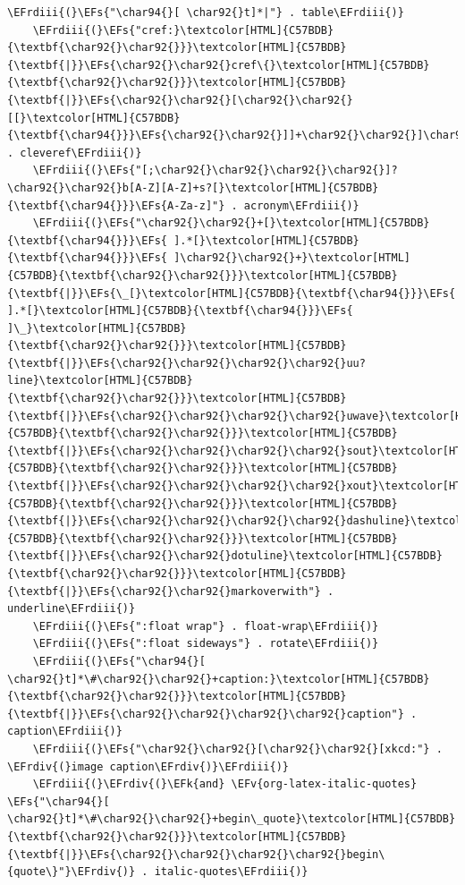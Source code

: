 \documentclass{scrartcl}
\newcommand{\EFk}[1]{\textcolor{EFk}{#1}} %
\newcommand{\EFs}[1]{\textcolor{EFs}{#1}} %
\newcommand{\EFv}[1]{\textcolor{EFv}{#1}} %
\newcommand{\EFrdiii}[1]{#1} %
\newcommand{\EFrdiv}[1]{#1} %
\begin{document}
\begin{Code}
\begin{Verbatim}[]
    \EFrdiii{(}\EFs{"\char94{}[ \char92{}t]*|"} . table\EFrdiii{)}
    \EFrdiii{(}\EFs{"cref:}\textcolor[HTML]{C57BDB}{\textbf{\char92{}\char92{}}}\textcolor[HTML]{C57BDB}{\textbf{|}}\EFs{\char92{}\char92{}cref\{}\textcolor[HTML]{C57BDB}{\textbf{\char92{}\char92{}}}\textcolor[HTML]{C57BDB}{\textbf{|}}\EFs{\char92{}\char92{}[\char92{}\char92{}[[}\textcolor[HTML]{C57BDB}{\textbf{\char94{}}}\EFs{\char92{}\char92{}]]+\char92{}\char92{}]\char92{}\char92{}]"} . cleveref\EFrdiii{)}
    \EFrdiii{(}\EFs{"[;\char92{}\char92{}\char92{}\char92{}]?\char92{}\char92{}b[A-Z][A-Z]+s?[}\textcolor[HTML]{C57BDB}{\textbf{\char94{}}}\EFs{A-Za-z]"} . acronym\EFrdiii{)}
    \EFrdiii{(}\EFs{"\char92{}\char92{}+[}\textcolor[HTML]{C57BDB}{\textbf{\char94{}}}\EFs{ ].*[}\textcolor[HTML]{C57BDB}{\textbf{\char94{}}}\EFs{ ]\char92{}\char92{}+}\textcolor[HTML]{C57BDB}{\textbf{\char92{}\char92{}}}\textcolor[HTML]{C57BDB}{\textbf{|}}\EFs{\_[}\textcolor[HTML]{C57BDB}{\textbf{\char94{}}}\EFs{ ].*[}\textcolor[HTML]{C57BDB}{\textbf{\char94{}}}\EFs{ ]\_}\textcolor[HTML]{C57BDB}{\textbf{\char92{}\char92{}}}\textcolor[HTML]{C57BDB}{\textbf{|}}\EFs{\char92{}\char92{}\char92{}\char92{}uu?line}\textcolor[HTML]{C57BDB}{\textbf{\char92{}\char92{}}}\textcolor[HTML]{C57BDB}{\textbf{|}}\EFs{\char92{}\char92{}\char92{}\char92{}uwave}\textcolor[HTML]{C57BDB}{\textbf{\char92{}\char92{}}}\textcolor[HTML]{C57BDB}{\textbf{|}}\EFs{\char92{}\char92{}\char92{}\char92{}sout}\textcolor[HTML]{C57BDB}{\textbf{\char92{}\char92{}}}\textcolor[HTML]{C57BDB}{\textbf{|}}\EFs{\char92{}\char92{}\char92{}\char92{}xout}\textcolor[HTML]{C57BDB}{\textbf{\char92{}\char92{}}}\textcolor[HTML]{C57BDB}{\textbf{|}}\EFs{\char92{}\char92{}\char92{}\char92{}dashuline}\textcolor[HTML]{C57BDB}{\textbf{\char92{}\char92{}}}\textcolor[HTML]{C57BDB}{\textbf{|}}\EFs{\char92{}\char92{}dotuline}\textcolor[HTML]{C57BDB}{\textbf{\char92{}\char92{}}}\textcolor[HTML]{C57BDB}{\textbf{|}}\EFs{\char92{}\char92{}markoverwith"} . underline\EFrdiii{)}
    \EFrdiii{(}\EFs{":float wrap"} . float-wrap\EFrdiii{)}
    \EFrdiii{(}\EFs{":float sideways"} . rotate\EFrdiii{)}
    \EFrdiii{(}\EFs{"\char94{}[ \char92{}t]*\#\char92{}\char92{}+caption:}\textcolor[HTML]{C57BDB}{\textbf{\char92{}\char92{}}}\textcolor[HTML]{C57BDB}{\textbf{|}}\EFs{\char92{}\char92{}\char92{}\char92{}caption"} . caption\EFrdiii{)}
    \EFrdiii{(}\EFs{"\char92{}\char92{}[\char92{}\char92{}[xkcd:"} . \EFrdiv{(}image caption\EFrdiv{)}\EFrdiii{)}
    \EFrdiii{(}\EFrdiv{(}\EFk{and} \EFv{org-latex-italic-quotes} \EFs{"\char94{}[ \char92{}t]*\#\char92{}\char92{}+begin\_quote}\textcolor[HTML]{C57BDB}{\textbf{\char92{}\char92{}}}\textcolor[HTML]{C57BDB}{\textbf{|}}\EFs{\char92{}\char92{}\char92{}\char92{}begin\{quote\}"}\EFrdiv{)} . italic-quotes\EFrdiii{)}

\end{Verbatim}
\end{Code}
\end{document}
